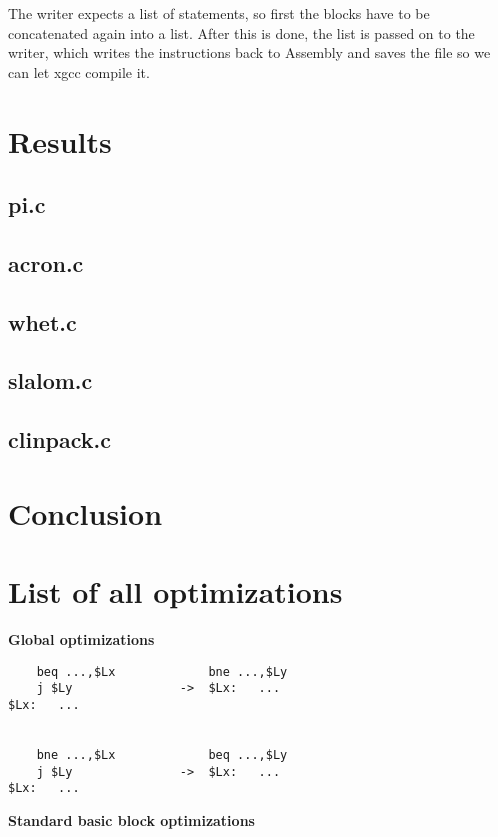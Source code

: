 \documentclass[10pt,a4paper]{article}
\begin{document}
The writer expects a list of statements, so first the blocks have to be
concatenated again into a list. After this is done, the list is passed on to
the writer, which writes the instructions back to Assembly and saves the file
so we can let xgcc compile it.

\section{Results}

\subsection{pi.c}

\subsection{acron.c}

\subsection{whet.c}

\subsection{slalom.c}

\subsection{clinpack.c}

\section{Conclusion}

\appendix

\section{List of all optimizations}

\label{opt}

\textbf{Global optimizations}

\begin{verbatim}
    beq ...,$Lx             bne ...,$Ly
    j $Ly               ->  $Lx:   ...
$Lx:   ...


    bne ...,$Lx             beq ...,$Ly
    j $Ly               ->  $Lx:   ...
$Lx:   ...
\end{verbatim}
\textbf{Standard basic block optimizations}
\end{document}
